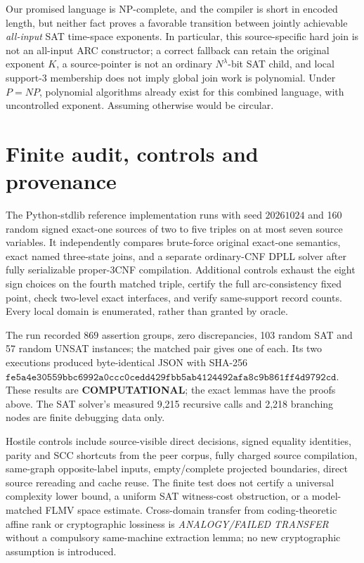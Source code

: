 \documentclass[11pt]{article}
\begin{document}
Our promised language is NP-complete, and the compiler is short in encoded length, but neither fact proves a favorable transition between jointly achievable \emph{all-input} SAT time-space exponents. In particular, this source-specific hard join is not an all-input ARC constructor; a correct fallback can retain the original exponent \(K\), a source-pointer is not an ordinary \(N^\lambda\)-bit SAT child, and local support-3 membership does not imply global join work is polynomial. Under \(P=NP\), polynomial algorithms already exist for this combined language, with uncontrolled exponent. Assuming otherwise would be circular.

\section{Finite audit, controls and provenance}
The Python-stdlib reference implementation runs with seed \(20261024\) and 160 random signed exact-one sources of two to five triples on at most seven source variables. It independently compares brute-force original exact-one semantics, exact named three-state joins, and a separate ordinary-CNF DPLL solver after fully serializable proper-3CNF compilation. Additional controls exhaust the eight sign choices on the fourth matched triple, certify the full arc-consistency fixed point, check two-level exact interfaces, and verify same-support record counts. Every local domain is enumerated, rather than granted by oracle.

The run recorded \(869\) assertion groups, zero discrepancies, 103 random SAT and 57 random UNSAT instances; the matched pair gives one of each. Its two executions produced byte-identical JSON with SHA-256
\(\texttt{fe5a4e30559bbc6992a0ccc0cedd429fbb5ab4124492afa8c9b861ff4d9792cd}\).
These results are \textbf{COMPUTATIONAL}; the exact lemmas have the proofs above. The SAT solver's measured 9,215 recursive calls and 2,218 branching nodes are finite debugging data only.

Hostile controls include source-visible direct decisions, signed equality identities, parity and SCC shortcuts from the peer corpus, fully charged source compilation, same-graph opposite-label inputs, empty/complete projected boundaries, direct source rereading and cache reuse. The finite test does not certify a universal complexity lower bound, a uniform SAT witness-cost obstruction, or a model-matched FLMV space estimate. Cross-domain transfer from coding-theoretic affine rank or cryptographic lossiness is \emph{ANALOGY/FAILED TRANSFER} without a compulsory same-machine extraction lemma; no new cryptographic assumption is introduced.
\end{document}
